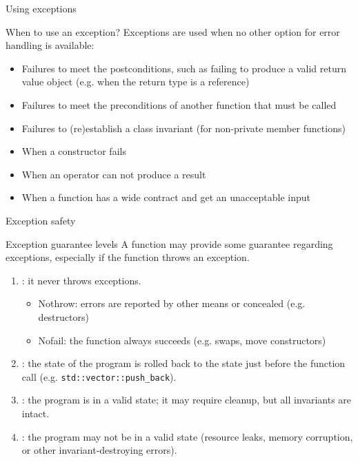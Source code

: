 
\begin{frame}{Using exceptions}{}
  \begin{block}{When to use an exception?}
    Exceptions are used when no other option for error handling is available:
    \begin{itemize}
    \item
      Failures to meet the postconditions, such as failing to produce a valid return value object (e.g. when the return type is a reference)
    \item
      Failures to meet the preconditions of another function that must be called
    \item
      Failures to (re)establish a class invariant (for non-private member functions)
    \end{itemize}
  \end{block}

  \begin{examples}
    \begin{itemize}
    \item
      When a constructor fails
    \item
      When an operator can not produce a result
    \item
      When a function has a wide contract and get an unacceptable input
    \end{itemize}
  \end{examples}
\end{frame}

\begin{frame}{Exception safety}{}
  \begin{block}{Exception guarantee levels}
    A function may provide some guarantee regarding exceptions, especially if the function throws an exception.
    \begin{enumerate}
    \item
      : it never throws exceptions.
      \begin{itemize}
      \item
        Nothrow: errors are reported by other means or concealed (e.g. destructors)
      \item
        Nofail: the function always succeeds (e.g. swaps, move constructors)
      \end{itemize}
    \item
      : the state of the program is rolled back to the state just before the function call (e.g. \lstinline!std::vector::push_back!).
    \item
      : the program is in a valid state; it may require cleanup, but all invariants are intact.
    \item
      : the program may not be in a valid state (resource leaks, memory corruption, or other invariant-destroying errors).
    \end{enumerate}
  \end{block}
\end{frame}




